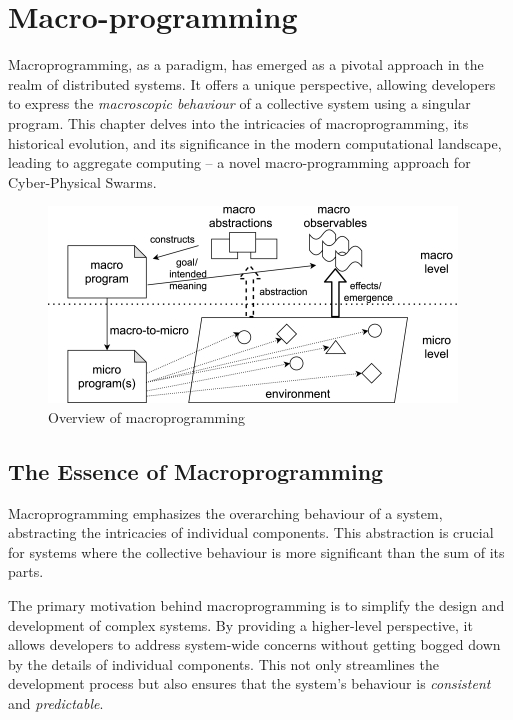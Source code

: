 
\chapter{Macro-programming}\label{chap:macro-programming}%
\minitoc%

Macroprogramming, as a paradigm, 
 has emerged as a pivotal approach in the realm of distributed systems. 
%
It offers a unique perspective, 
 allowing developers to express the \emph{macroscopic behaviour} of a collective system using a singular program.
% 
This chapter delves into the intricacies of macroprogramming, 
 its historical evolution, and its significance in the modern computational landscape, 
 leading to aggregate computing -- a novel macro-programming approach for Cyber-Physical Swarms.

\begin{figure}
\includegraphics[width=\textwidth]{chapters/img/macro-programming.jpg}
\caption{Overview of macroprogramming}\label{macro:fig:macro-programming}
\end{figure}
\section{The Essence of Macroprogramming}
Macroprogramming  emphasizes the overarching behaviour of a system, abstracting the intricacies of individual components. 
 This abstraction is crucial for systems where the collective behaviour is more significant than the sum of its parts.

The primary motivation behind macroprogramming 
 is to simplify the design and development of complex systems. 
 By providing a higher-level perspective, 
 it allows developers to address system-wide concerns without getting bogged down by the details of individual components. 
 This not only streamlines the development process but also ensures that the system's behaviour is \emph{consistent} and \emph{predictable}.

